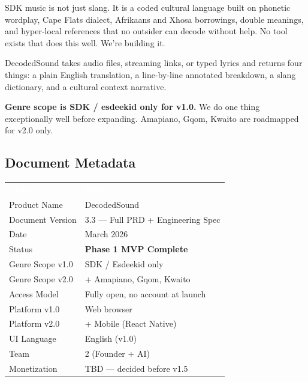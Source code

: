 \documentclass[12pt, a4paper]{article}
\begin{document}
\vspace{0.6em}

SDK music is not just slang. It is a coded cultural language built on phonetic
wordplay, Cape Flats dialect, Afrikaans and Xhosa borrowings, double meanings,
and hyper-local references that no outsider can decode without help. No tool
exists that does this well. We're building it.

DecodedSound takes audio files, streaming links, or typed lyrics and returns
four things: a plain English translation, a line-by-line annotated breakdown,
a slang dictionary, and a cultural context narrative.

\textbf{Genre scope is SDK / esdeekid only for v1.0.} We do one thing
exceptionally well before expanding. Amapiano, Gqom, Kwaito are roadmapped
for v2.0 only.

\subsection*{Document Metadata}
\renewcommand{\arraystretch}{1.4}
\begin{center}
\begin{tabular}{L{5cm} L{8.5cm}}
  \textcolor{white}{\textbf{Field}} &
  \textcolor{white}{\textbf{Value}} \\
   Product Name      & DecodedSound \\
  Document Version                    & 3.3 — Full PRD + Engineering Spec \\
   Date              & March 2026 \\
  Status                              & \textcolor{successgreen}{\textbf{Phase 1 MVP Complete}} \\
   Genre Scope v1.0  & SDK / Esdeekid only \\
  Genre Scope v2.0                    & + Amapiano, Gqom, Kwaito \\
   Access Model      & Fully open, no account at launch \\
  Platform v1.0                       & Web browser \\
   Platform v2.0     & + Mobile (React Native) \\
  UI Language                         & English (v1.0) \\
   Team              & 2 (Founder + AI) \\
  Monetization                        & TBD — decided before v1.5 \\
\end{tabular}
\end{center}
\end{document}
